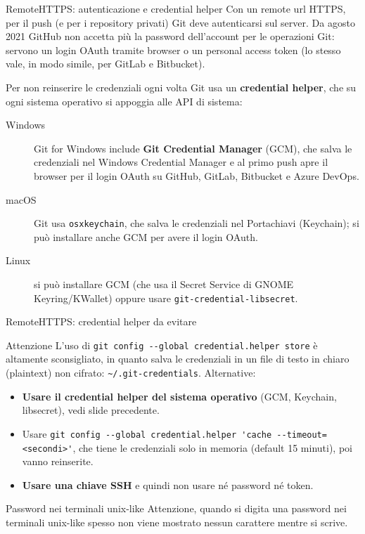 \documentclass[aspectratio=169,handout,10pt]{beamer}
\begin{document}
\begin{frame}[fragile]{Remote}{HTTPS: autenticazione e credential helper}
    Con un remote url HTTPS, per il push (e per i repository privati) Git deve autenticarsi sul server. Da agosto 2021 GitHub non accetta più la password dell'account per le operazioni Git: servono un login OAuth tramite browser o un personal access token (lo stesso vale, in modo simile, per GitLab e Bitbucket).

    Per non reinserire le credenziali ogni volta Git usa un \textbf{credential helper}, che su ogni sistema operativo si appoggia alle API di sistema:
    \begin{description}
        \item[Windows] Git for Windows include \textbf{Git Credential Manager} (GCM), che salva le credenziali nel Windows Credential Manager e al primo push apre il browser per il login OAuth su GitHub, GitLab, Bitbucket e Azure DevOps.
        \item[macOS] Git usa \lstinline{osxkeychain}, che salva le credenziali nel Portachiavi (Keychain); si può installare anche GCM per avere il login OAuth.
        \item[Linux] si può installare GCM (che usa il Secret Service di GNOME Keyring/KWallet) oppure usare \lstinline{git-credential-libsecret}.
    \end{description}
\end{frame}
\begin{frame}[fragile]{Remote}{HTTPS: credential helper da evitare}
    \begin{alertblock}{Attenzione}
        L'uso di \lstinline{git config --global credential.helper store} è altamente sconsigliato, in quanto salva le credenziali in un file di testo in chiaro (plaintext) non cifrato: \lstinline{~/.git-credentials}. Alternative:
        \begin{itemize}
            \item \textbf{Usare il credential helper del sistema operativo} (GCM, Keychain, libsecret), vedi slide precedente.
            \item Usare \lstinline{git config --global credential.helper 'cache --timeout=<secondi>'}, che tiene le credenziali solo in memoria (default 15 minuti), poi vanno reinserite.
            \item \textbf{Usare una chiave SSH} e quindi non usare né password né token.
        \end{itemize}
    \end{alertblock}
    \begin{block}{Password nei terminali unix-like}
        Attenzione, quando si digita una password nei terminali unix-like spesso non viene mostrato nessun carattere mentre si scrive.
    \end{block}
\end{frame}
\end{document}
